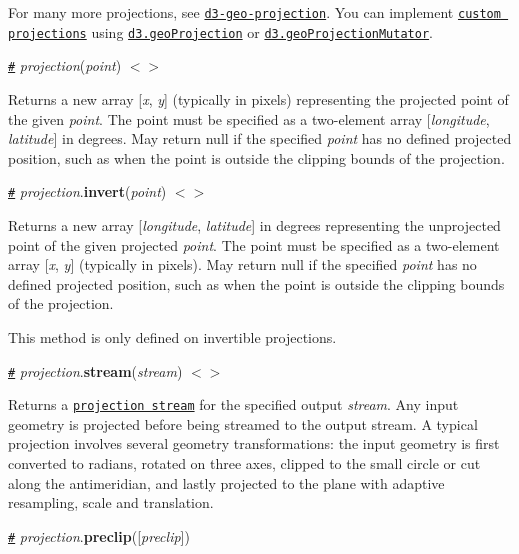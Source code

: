 For many more projections, see \href{https://github.com/d3/d3-geo-projection}{\tt d3-\/geo-\/projection}. You can implement \href{#raw-projections}{\tt custom projections} using \href{#geoProjection}{\tt d3.\+geo\+Projection} or \href{#geoProjectionMutator}{\tt d3.\+geo\+Projection\+Mutator}.

\href{#_projection}{\tt \#} {\itshape projection}({\itshape point}) \href{https://github.com/d3/d3-geo/blob/master/src/projection/index.js#L34}{\tt $<$$>$}

Returns a new array \mbox{[}{\itshape x}, {\itshape y}\mbox{]} (typically in pixels) representing the projected point of the given {\itshape point}. The point must be specified as a two-\/element array \mbox{[}{\itshape longitude}, {\itshape latitude}\mbox{]} in degrees. May return null if the specified {\itshape point} has no defined projected position, such as when the point is outside the clipping bounds of the projection.

\href{#projection_invert}{\tt \#} {\itshape projection}.{\bfseries invert}({\itshape point}) \href{https://github.com/d3/d3-geo/blob/master/src/projection/index.js#L39}{\tt $<$$>$}

Returns a new array \mbox{[}{\itshape longitude}, {\itshape latitude}\mbox{]} in degrees representing the unprojected point of the given projected {\itshape point}. The point must be specified as a two-\/element array \mbox{[}{\itshape x}, {\itshape y}\mbox{]} (typically in pixels). May return null if the specified {\itshape point} has no defined projected position, such as when the point is outside the clipping bounds of the projection.

This method is only defined on invertible projections.

\href{#projection_stream}{\tt \#} {\itshape projection}.{\bfseries stream}({\itshape stream}) \href{https://github.com/d3/d3-geo/blob/master/src/projection/index.js#L48}{\tt $<$$>$}

Returns a \href{#streams}{\tt projection stream} for the specified output {\itshape stream}. Any input geometry is projected before being streamed to the output stream. A typical projection involves several geometry transformations\+: the input geometry is first converted to radians, rotated on three axes, clipped to the small circle or cut along the antimeridian, and lastly projected to the plane with adaptive resampling, scale and translation.

\href{#projection_preclip}{\tt \#} {\itshape projection}.{\bfseries preclip}(\mbox{[}{\itshape preclip}\mbox{]})

